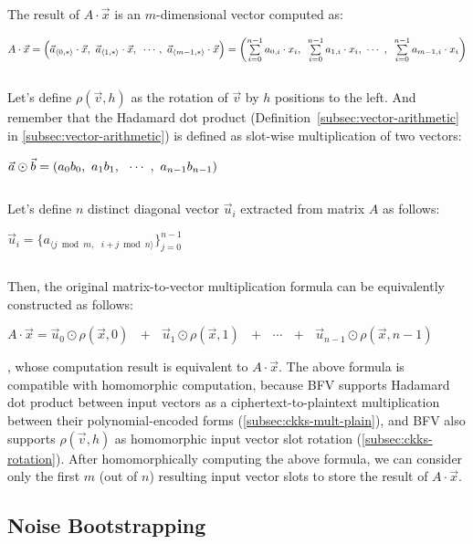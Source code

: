 $ $

The result of $A \cdot \vec{x}$ is an $m$-dimensional vector computed as:

$A \cdot \vec{x} = \Big(\vec{a}_{\langle 0, * \rangle} \cdot \vec{x}, \text{ } \vec{a}_{\langle 1, * \rangle} \cdot \vec{x}, \text{ }\cdots,\text{ } \vec{a}_{\langle m-1, * \rangle} \cdot \vec{x} \Big) = \left(\sum\limits_{i=0}^{n-1} a_{0, i} \cdot  x_i, \text{ } \sum\limits_{i=0}^{n-1}  a_{1, i} \cdot x_i, \text{ } \text{$\cdots$} \text{ }, \text{ } \sum\limits_{i=0}^{n-1} a_{m-1, i} \cdot x_i \right)$

$ $

Let's define $\rho(\vec{v}, h)$ as the rotation of $\vec{v}$ by $h$ positions to the left. And remember that the Hadamard dot product (Definition~\ref*{subsec:vector-arithmetic} in \autoref{subsec:vector-arithmetic}) is defined as slot-wise multiplication of two vectors: 

$\vec{a} \odot \vec{b} = (a_0 b_0, \text{ } a_1 b_1, \text{ } \text{ } \text{$\cdots$} \text{ }, \text{ } a_{n-1} b_{n-1})$

$ $

Let's define $n$ distinct diagonal vector $\vec{u}_i$ extracted from matrix $A$ as follows: 

$\vec{u}_i = \{a_{\langle j \bmod m, \text{ } i + j\bmod n \rangle}\}_{j = 0}^{n-1}$

$ $

Then, the original matrix-to-vector multiplication formula can be equivalently constructed as follows:

$A \cdot \vec{x} = \vec{u}_0 \odot \rho(\vec{x}, 0) \text{ } + \text{ } \vec{u}_1 \odot \rho(\vec{x}, 1) \text{ } + \text{ } \cdots \text{ } + \text{ } \vec{u}_{n-1} \odot \rho(\vec{x}, n-1)$

, whose computation result is equivalent to $A \cdot \vec{x}$. 
The above formula is compatible with homomorphic computation, because BFV supports Hadamard dot product between input vectors as a ciphertext-to-plaintext multiplication between their polynomial-encoded forms (\autoref{subsec:ckks-mult-plain}), and BFV also supports $\rho(\vec{v}, h)$ as homomorphic input vector slot rotation (\autoref{subsec:ckks-rotation}). After homomorphically computing the above formula, we can consider only the first $m$ (out of $n$) resulting input vector slots to store the result of $A \cdot \vec{x}$. 



\subsection{Noise Bootstrapping}
\label{subsec:bfv-bootstrapping}

